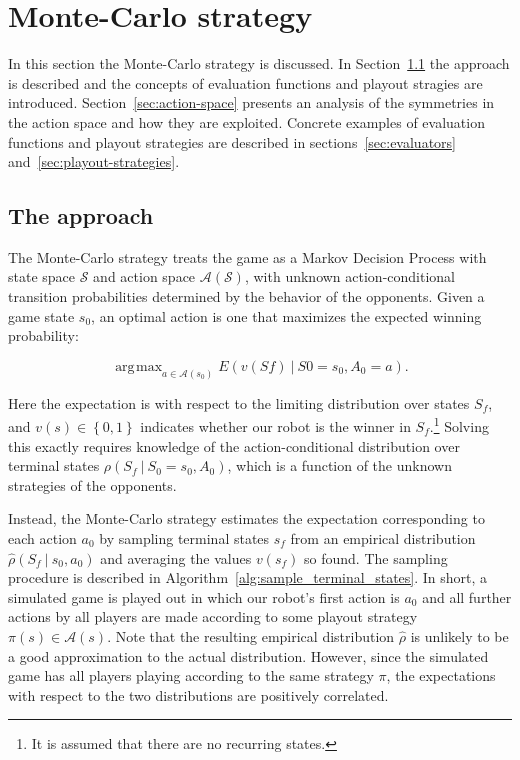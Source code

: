 \documentclass{article}
\newcommand{\Action}{A}
\newcommand{\action}{a}
\newcommand{\actions}{\mathcal{A}}
\newcommand{\randomState}{S}
\newcommand{\state}{s}
\newcommand{\states}{\mathcal{S}}
\newcommand{\evaluator}{v}
\newcommand{\probability}{\rho}
\newcommand{\expectation}[2]{E\left({#1\given#2}\right)}
\newcommand{\given}[1][]{\:#1\vert\:}
\DeclareMathOperator*{\argmax}{\arg\!\max}
\newcommand{\initial}{0}
\newcommand{\final}{f}
\begin{document}
\section{Monte-Carlo strategy}

In this section the Monte-Carlo strategy is discussed.  In Section~\ref{sec:approach} the approach is described and the concepts of evaluation functions and playout stragies are introduced.  Section~\ref{sec:action-space} presents an analysis of the symmetries in the action space and how they are exploited.  Concrete examples of evaluation functions and playout strategies are described in sections~\ref{sec:evaluators} and~\ref{sec:playout-strategies}.

\subsection{The approach} \label{sec:approach}

The Monte-Carlo strategy treats the game as a Markov Decision Process\cite{puterman2009markov} with state space $\states$ and action space $\actions(\states)$, with unknown action-conditional transition probabilities determined by the behavior of the opponents.  Given a game state $\state_\initial$, an optimal action is one that maximizes the expected winning probability:

\[
\argmax_{\action \in \actions\left(\state_\initial\right)} \expectation{\evaluator\left(\randomState\final\right)}{\randomState\initial=\state_\initial, \Action_\initial=\action}.
\]

Here the expectation is with respect to the limiting distribution over states $\randomState_\final$, and $\evaluator\left(\state\right) \in \left\{0,1\right\}$ indicates whether our robot is the winner in $\randomState_\final$.\footnote{It is assumed that there are no recurring states.}  Solving this exactly requires knowledge of the action-conditional distribution over terminal states $\probability\left(\randomState_\final \given \randomState_\initial=\state_\initial, \Action_\initial\right)$, which is a function of the unknown strategies of the opponents.

Instead, the Monte-Carlo strategy estimates the expectation corresponding to each action $\action_\initial$ by sampling terminal states $\state_\final$ from an empirical distribution $\hat{\probability}\left(\randomState_\final \given \state_\initial,\action_\initial\right)$ and averaging the values $\evaluator\left(\state_\final\right)$ so found.  The sampling procedure is described in Algorithm~\ref{alg:sample_terminal_states}.  In short, a simulated game is played out in which our robot's first action is $\action_\initial$ and all further actions by all players are made according to some playout strategy $\pi\left(\state\right) \in \actions\left(\state\right)$.  Note that the resulting empirical distribution $\hat{\probability}$ is unlikely to be a good approximation to the actual distribution.  However, since the simulated game has all players playing according to the same strategy $\pi$, the expectations with respect to the two distributions are positively correlated.
\end{document}
